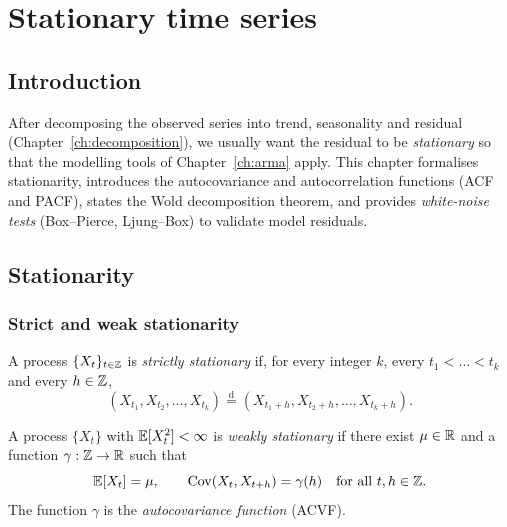 
\chapter{Stationary time series}
\label{ch:stationarity}

\section*{Introduction}

After decomposing the observed series into trend, seasonality and
residual (Chapter~\ref{ch:decomposition}), we usually want the residual
to be \emph{stationary} so that the modelling tools of
Chapter~\ref{ch:arma} apply. This chapter formalises stationarity,
introduces the autocovariance and autocorrelation functions (ACF and
PACF), states the Wold decomposition theorem, and provides
\emph{white-noise tests} (Box--Pierce, Ljung--Box) to validate model
residuals.

\section{Stationarity}
\label{sec:stationarity}

\subsection{Strict and weak stationarity}

\begin{defbox}
\label{def:strict-stat}
A process $\{X_t\}_{t \in \mathbb{Z}}$ is \emph{strictly stationary} if, for
every integer $k$, every $t_1 < \dots < t_k$ and every $h \in \mathbb{Z}$,
\[
  (X_{t_1}, X_{t_2}, \dots, X_{t_k})
  \overset{\text{d}}{=}
  (X_{t_1 + h}, X_{t_2 + h}, \dots, X_{t_k + h}).
\]
\end{defbox}

\begin{defbox}
\label{def:weak-stat}
A process $\{X_t\}$ with $\mathbb{E}[X_t^2] < \infty$ is \emph{weakly
stationary} if there exist $\mu \in \mathbb{R}$ and a function
$\gamma : \mathbb{Z} \to \mathbb{R}$ such that
\[
  \mathbb{E}[X_t] = \mu, \qquad
  \mathrm{Cov}(X_t, X_{t+h}) = \gamma(h) \quad \text{for all } t, h \in \mathbb{Z}.
\]
The function $\gamma$ is the \emph{autocovariance function} (ACVF).
\end{defbox}

